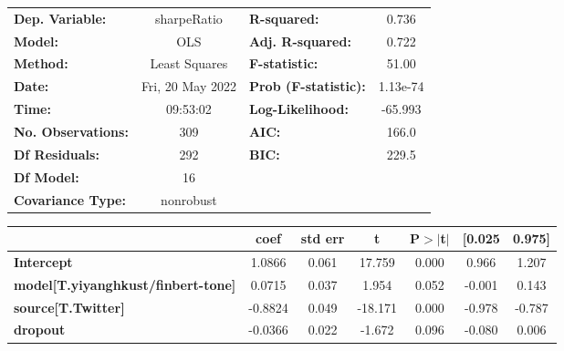 \begin{center}
\begin{tabular}{lclc}
\toprule
\textbf{Dep. Variable:}                    &   sharpeRatio    & \textbf{  R-squared:         } &     0.736   \\
\textbf{Model:}                            &       OLS        & \textbf{  Adj. R-squared:    } &     0.722   \\
\textbf{Method:}                           &  Least Squares   & \textbf{  F-statistic:       } &     51.00   \\
\textbf{Date:}                             & Fri, 20 May 2022 & \textbf{  Prob (F-statistic):} &  1.13e-74   \\
\textbf{Time:}                             &     09:53:02     & \textbf{  Log-Likelihood:    } &   -65.993   \\
\textbf{No. Observations:}                 &         309      & \textbf{  AIC:               } &     166.0   \\
\textbf{Df Residuals:}                     &         292      & \textbf{  BIC:               } &     229.5   \\
\textbf{Df Model:}                         &          16      & \textbf{                     } &             \\
\textbf{Covariance Type:}                  &    nonrobust     & \textbf{                     } &             \\
\bottomrule
\end{tabular}
\begin{tabular}{lcccccc}
                                           & \textbf{coef} & \textbf{std err} & \textbf{t} & \textbf{P$> |$t$|$} & \textbf{[0.025} & \textbf{0.975]}  \\
\midrule
\textbf{Intercept}                         &       1.0866  &        0.061     &    17.759  &         0.000        &        0.966    &        1.207     \\
\textbf{model[T.yiyanghkust/finbert-tone]} &       0.0715  &        0.037     &     1.954  &         0.052        &       -0.001    &        0.143     \\
\textbf{source[T.Twitter]}                 &      -0.8824  &        0.049     &   -18.171  &         0.000        &       -0.978    &       -0.787     \\
\textbf{dropout}                           &      -0.0366  &        0.022     &    -1.672  &         0.096        &       -0.080    &        0.006     \\

\end{tabular}
\end{center}
